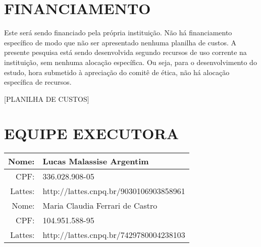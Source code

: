 \documentclass[rascunho,xindy]{fei}
\begin{document}
%

\chapter{FINANCIAMENTO}

Este será sendo financiado pela própria instituição. Não há financiamento específico de modo que não ser apresentado nenhuma planilha de custos. A presente pesquisa está sendo desenvolvida segundo recursos de uso corrente na instituição, sem nenhuma alocação específica. Ou seja, para o desenvolvimento do estudo, hora submetido à apreciação do comitê de ética, não há alocação específica de recursos.

[PLANILHA DE CUSTOS]


\chapter{EQUIPE EXECUTORA}

\begin{tabular}{| r || l |}
    \hline
        Nome:   & Lucas Malassise Argentim \\ \hline
        CPF:    & 336.028.908-05 \\ \hline
        Lattes: & http://lattes.cnpq.br/9030106903858961 \\ \hline
    \hline
        Nome:   & Maria Claudia Ferrari de Castro \\ \hline
        CPF:    & 104.951.588-95 \\ \hline
        Lattes: & http://lattes.cnpq.br/7429780004238103 \\
    \hline
\end{tabular}




\printindex
\end{document}
